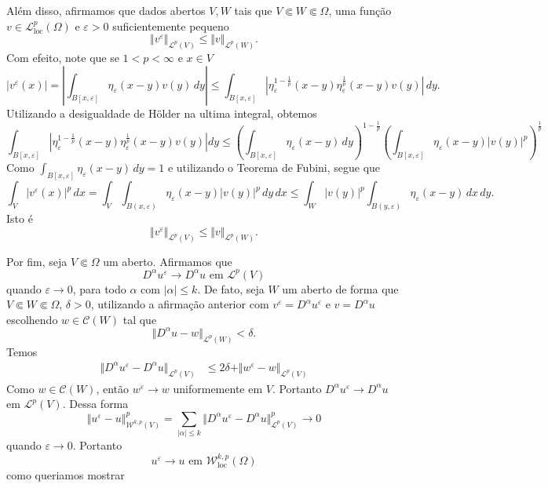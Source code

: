 \documentclass[a4paper, 11pt]{book}
\theoremstyle{definition}
\newcommand{\cC}{\mathcal{C}}
\newcommand{\cL}{\mathcal{L}}
\newcommand{\cW}{\mathcal{W}}
\newcommand{\loc}{\mathrm{loc}}
\begin{document}
\begin{prf}
    Além disso, afirmamos que dados abertos $V, W$ tais que $V \Subset W \Subset \Omega$, uma função $v \in \cL^p_\loc(\Omega)$ e $\varepsilon > 0$ suficientemente pequeno
    \[
        \Vert v^\varepsilon \Vert_{\cL^p(V)} \leqslant \Vert v \Vert_{\cL^p(W)}.
    \]
    Com efeito, note que se $1 < p < \infty$ e $x \in V$
    \[
        |v^\varepsilon(x)| = \left| \int_{B[x,\varepsilon]} \eta_\varepsilon(x-y) v (y) \,dy \right| \leqslant \int_{B[x,\varepsilon]} \left| \eta_\varepsilon^{1-\frac{1}{p}}(x-y) \eta_\varepsilon^{\frac{1}{p}}(x-y) v(y) \right| \,dy.
    \]
    Utilizando a desigualdade de Hölder na ultima integral, obtemos
    \[
        \int_{B[x,\varepsilon]} \left| \eta_\varepsilon^{1-\frac{1}{p}}(x-y) \eta_\varepsilon^{\frac{1}{p}}(x-y) v(y) \right|dy \leqslant \left( \int_{B[x,\varepsilon]} \eta_\varepsilon (x-y) \,dy\right)^{\!1-\frac{1}{p}} \left( \int_{B[x,\varepsilon]} \eta_\varepsilon(x-y) |v(y)|^p \right)^{\frac{1}{p}}
    \]
    Como $\int_{B[x,\varepsilon]} \eta_\varepsilon(x-y) \,dy = 1$ e utilizando o Teorema de Fubini, segue que
    \[
        \int_V |v^\varepsilon(x)|^p \,dx = \int_V \int_{B(x,\varepsilon)} \eta_\varepsilon(x-y) |v(y)|^p \,dy \,dx \leqslant \int_W |v(y)|^p \int_{B(y,\varepsilon)} \eta_\varepsilon(x-y) \,dx \,dy.
    \]
    Isto é
    \[
        \Vert v^\varepsilon \Vert_{\cL^p(V)} \leqslant \Vert v \Vert_{\cL^p(W)}.
    \]

    Por fim, seja $V \Subset \Omega$ um aberto. Afirmamos que
    \[
        D ^\alpha u^\varepsilon \to D^\alpha u \text{ em } \cL^p(V)
    \]
    quando $\varepsilon \to 0$, para todo $\alpha$ com $|\alpha| \leqslant k$.
    De fato, seja $W$ um aberto de forma que $V \Subset W \Subset \Omega$, $\delta > 0$, utilizando a afirmação anterior com $v ^\varepsilon = D^\alpha u^\varepsilon$ e $v = D^\alpha u$ escolhendo $w \in \cC(W)$ tal que
    \[
        \Vert D^\alpha u - w \Vert_{\cL^p(W)} < \delta.
    \]
    Temos
    \[
        \begin{aligned}
            \Vert D^\alpha u^\varepsilon - D^\alpha u \Vert_{\cL^p(V)} 
            &\leqslant 2\delta + \Vert w^\varepsilon - w \Vert_{\cL^p(V)}
        \end{aligned}
    \]
    Como $w \in \cC(W)$, então $w^\varepsilon \to w$ uniformemente em $V$. 
    Portanto $D^\alpha u^\varepsilon \to D^\alpha u$ em $\cL^p(V)$.
    Dessa forma
    \[
        \Vert u^\varepsilon - u \Vert^p_{\cW^{k,p}(V)} = \sum_{|\alpha| \leqslant k} \Vert D^\alpha u^\varepsilon - D^\alpha u \Vert^p_{\cL^p(V)} \to 0 
    \]
    quando $\varepsilon \to 0$. Portanto
    \[
        u^\varepsilon \to u \text{ em } \cW^{k,p}_\loc(\Omega)
    \]
    como queriamos mostrar
\end{prf}
\end{document}
